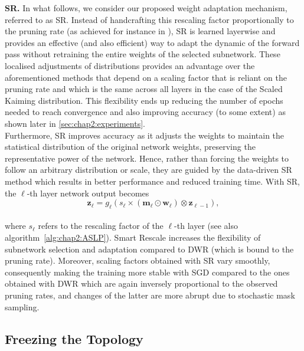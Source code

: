\noindent\textbf{\acl{SR}.} In what follows, we consider our proposed weight
adaptation mechanism, referred to as \acf{SR}. Instead of handcrafting this
rescaling factor proportionally to the pruning rate (as achieved for instance in
\cite{DBLP:conf/nips/ZhouLLY19}), \ac{SR} is learned layerwise and provides an
effective (and also efficient) way to adapt the dynamic of the forward pass
without retraining the entire weights of the selected subnetwork. These
localised adjustments of distributions provides an advantage over the
aforementioned methods that depend on a scaling factor that is reliant on the
pruning rate and which is the same across all layers in the case of the Scaled
Kaiming distribution. This flexibility ends up reducing the number of epochs
needed to reach convergence and also improving accuracy (to some extent) as
shown later in \cref{sec:chap2:experiments}.\\

Furthermore, \ac{SR} improves accuracy as it adjusts the weights to maintain the
statistical distribution of the original network weights, preserving the
representative power of the network. Hence, rather than forcing the weights to
follow an arbitrary distribution or scale, they are guided by the data-driven
\ac{SR} method which results in better performance and reduced training time.
With \ac{SR}, the $\ell$-th layer network output becomes \\

\begin{equation}
  \mathbf{z}_{\ell} = g_\ell(s_\ell \times (\bm{m}_\ell \odot \bm{w}_\ell) \otimes \mathbf{z}_{\ell-1}),
\end{equation}\\

\noindent where $s_\ell$ refers to the rescaling factor  of the $\ell$-th layer
(see also algorithm~\ref{alg:chap2:ASLP}). Smart Rescale increases the
flexibility of subnetwork selection and adaptation compared to \ac{DWR} (which
is bound to the pruning rate). Moreover, scaling factors obtained with \ac{SR}
vary smoothly, consequently making the training more stable with \ac{SGD}
compared to the ones obtained with \ac{DWR} which are again inversely
proportional to the observed pruning rates, and changes of the latter are more
abrupt due to stochastic mask sampling. \\


\subsection{Freezing the Topology}
\label{sec:chap2:freezing_topology}

